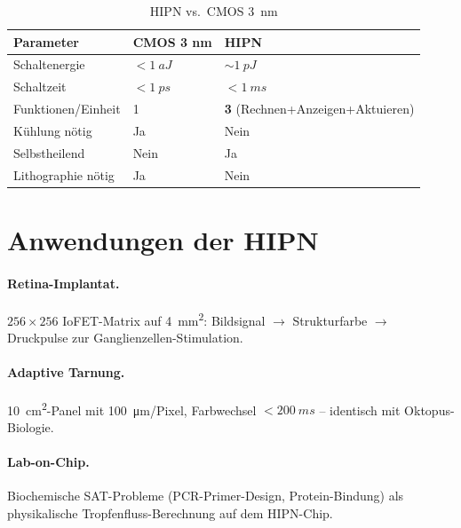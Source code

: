 ﻿\documentclass[a4paper,12pt]{scrreprt}
\theoremstyle{definition}
\begin{document}
\begin{table}[H]
\small
\caption{HIPN vs.\ CMOS \SI{3}{nm}}
\label{tab:nf2_vergleich}
\begin{tabular}{lll}
\toprule
\textbf{Parameter} & \textbf{CMOS 3 nm} & \textbf{HIPN} \\
\midrule
Schaltenergie       & $<\SI{1}{aJ}$      & $\sim\SI{1}{pJ}$ \\
Schaltzeit          & $<\SI{1}{ps}$      & $<\SI{1}{ms}$ \\
Funktionen/Einheit  & 1                  & \textbf{3} (Rechnen+Anzeigen+Aktuieren) \\
Kühlung nötig       & Ja                 & Nein \\
Selbstheilend       & Nein               & Ja \\
Lithographie nötig  & Ja                 & Nein \\
\bottomrule
\end{tabular}
\end{table}

\section{Anwendungen der HIPN}

\paragraph{Retina-Implantat.} $256\times 256$ IoFET-Matrix auf
\SI{4}{mm^2}: Bildsignal $\to$ Strukturfarbe $\to$ Druckpulse zur
Ganglienzellen-Stimulation.

\paragraph{Adaptive Tarnung.} \SI{10}{cm^2}-Panel mit \SI{100}{\micro m}/Pixel,
Farbwechsel $<\SI{200}{ms}$ -- identisch mit Oktopus-Biologie.

\paragraph{Lab-on-Chip.} Biochemische SAT-Probleme (PCR-Primer-Design,
Protein-Bindung) als physikalische Tropfenfluss-Berechnung auf dem
HIPN-Chip.

\end{document}
